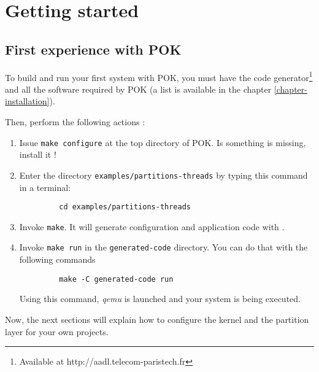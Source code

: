 %
%
%
%
%

\chapter{Getting started}

   \section{First experience with POK}
   To build and run your first system with POK, you must have the \ocarina code
   generator\footnote{Available at http://aadl.telecom-paristech.fr} and all the
   software required by POK (a list is available in the chapter
   \ref{chapter-installation}).

   Then, perform the following actions :
   \begin{enumerate}
      \item
         Issue \texttt{make configure} at the top directory of POK. Is something
         is missing, install it !
      \item
         Enter the directory \texttt{examples/partitions-threads} by typing
         this command in a terminal:
         \begin{verbatim}
         cd examples/partitions-threads
         \end{verbatim}
      \item
         Invoke \texttt{make}. It will generate configuration and application
         code with \ocarina.
      \item
         Invoke \texttt{make run} in the \texttt{generated-code} directory. You
         can do that with the following commands
         \begin{verbatim}
         make -C generated-code run
         \end{verbatim}
         Using this command, \textit{qemu} is launched and your system is being
         executed.
   \end{enumerate}

   Now, the next sections will explain how to configure the kernel and the
   partition layer for your own projects.

